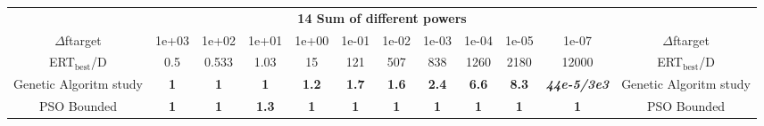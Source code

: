 \begin{tabular}{cccccccccccc}
 & \multicolumn{10}{c}{{\normalsize \textbf{14 Sum of different powers}}}\\
$\Delta$ftarget& 1e+03& 1e+02& 1e+01& 1e+00& 1e-01& 1e-02& 1e-03& 1e-04& 1e-05& 1e-07 & $\Delta$ftarget \\
ERT$_{\textrm{best}}$/D& 0.5& 0.533& 1.03& 15& 121& 507& 838& 1260& 2180& 12000 & ERT$_{\textrm{best}}$/D \\
\hline
Genetic Algoritm study & \textbf{1} & \textbf{1} & \textbf{1} & \textbf{1.2} & \textbf{1.7} & \textbf{1.6} & \textbf{2.4} & \textbf{6.6} & \textbf{8.3} & \textbf{\textit{44e-5}\textit{/3e3}} & Genetic Algoritm study \cite{add_an_entry_for_Genetic Algoritm study_in_bbob.bib}\\
PSO Bounded & \textbf{1} & \textbf{1} & \textbf{1.3} & \textbf{1} & \textbf{1} & \textbf{1} & \textbf{1} & \textbf{1} & \textbf{1} & \textbf{1} & PSO Bounded \cite{add_an_entry_for_PSO Bounded_in_bbob.bib}
\end{tabular}
